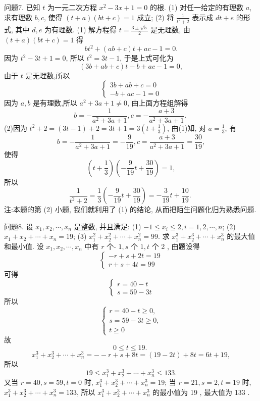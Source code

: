 问题7. 已知 $t$ 为一元二次方程 $x^2-3 x+1=0$ 的根.
(1) 对任一给定的有理数 $a$, 求有理数 $b, c$, 使得 $(t+a)(b t+c)=1$ 成立;
(2) 将 $\frac{1}{t^2+2}$ 表示成 $d t+e$ 的形式, 其中 $d, e$ 为有理数.
(1) 解方程得 $t=\frac{3 \pm \sqrt{5}}{2}$ 是无理数, 由 $(t+a)(b t+c)=1$ 得
$$
b t^2+(a b+c) t+a c-1=0 .
$$
因为 $t^2-3 t+1=0$, 所以 $t^2=3 t-1$, 于是上式可化为
$$
(3 b+a b+c) t-b+a c-1=0,
$$
由于 $t$ 是无理数,所以
$$
\left\{\begin{array}{l}
3 b+a b+c=0 \\
-b+a c-1=0
\end{array}\right.
$$
因为 $a, b$ 是有理数,所以 $a^2+3 a+1 \neq 0$, 由上面方程组解得
$$
b=-\frac{1}{a^2+3 a+1}, c=-\frac{a+3}{a^2+3 a+1} \text {. }
$$
(2)因为 $t^2+2=(3 t-1)+2=3 t+1=3\left(t+\frac{1}{3}\right)$, 由(1)知, 对 $a=\frac{1}{3}$, 有
$$
b=-\frac{1}{a^2+3 a+1}=-\frac{9}{19}, c=\frac{a+3}{a^2+3 a+1}=\frac{30}{19},
$$
使得
$$
\left(t+\frac{1}{3}\right)\left(-\frac{9}{19} t+\frac{30}{19}\right)=1,
$$
所以
$$
\frac{1}{t^2+2}=\frac{1}{3}\left(-\frac{9}{19} t+\frac{30}{19}\right)=-\frac{3}{19} t+\frac{10}{19} \text {. }
$$
注:本题的第 (2) 小题, 我们就利用了 (1) 的结论, 从而把陌生问题化归为熟悉问题.



问题8. 设 $x_1, x_2, \cdots, x_n$ 是整数, 并且满足:
(1) $-1 \leqslant x_i \leqslant 2, i=1,2, \cdots, n$;
(2) $x_1+x_2+\cdots+x_n=19$;
(3) $x_1^2+x_2^2+\cdots+x_n^2=99$.
求 $x_1^3+x_2^3+\cdots+x_n^3$ 的最大值和最小值.
设 $x_1, x_2, \cdots, x_n$ 中有 $r$ 个- $1, s$ 个 $1, t$ 个 2 , 由题设得
$$
\left\{\begin{array}{l}
-r+s+2 t=19 \\
r+s+4 t=99
\end{array}\right.
$$
可得
$$
\left\{\begin{array}{l}
r=40-t \\
s=59-3 t
\end{array}\right.
$$
所以
$$
\left\{\begin{array}{l}
r=40-t \geqslant 0, \\
s=59-3 t \geqslant 0, \\
t \geqslant 0
\end{array}\right.
$$
故
$$
0 \leqslant t \leqslant 19 \text {. }
$$
$$
x_1^3+x_2^3+\cdots+x_n^3=--r+s+8 t=(19-2 t)+8 t=6 t+19,
$$
所以
$$
19 \leqslant x_1^3+x_2^3+\cdots+x_n^3 \leqslant 133 .
$$
又当 $r=40, s=59, t=0$ 时, $x_1^3+x_2^3+\cdots+x_n^3=19$; 当 $r=21, s= 2, t=19$ 时, $x_1^3+x_2^3+\cdots+x_n^3=133$, 所以 $x_1^3+x_2^3+\cdots+x_n^3$ 的最小值为 19 , 最大值为 133 .



